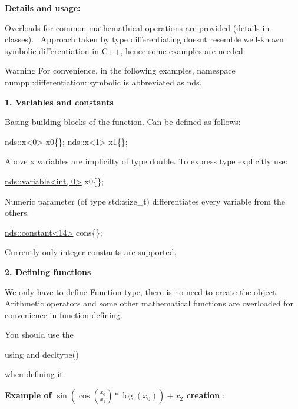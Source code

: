 {\bfseries Details and usage\+:}

Overloads for common mathemathical operations are provided (details in classes).~\newline
Approach taken by type differentiating doesn\textquotesingle{}t resemble well-\/known symbolic differentiation in C++, hence some examples are needed\+:

\begin{DoxyWarning}{Warning}
For convenience, in the following examples, namespace numpp\+::differentiation\+::symbolic is abbreviated as nds.
\end{DoxyWarning}
{\bfseries 1. Variables and constants }

Basing building blocks of the function. Can be defined as follows\+: 
\begin{DoxyCode}
\hyperlink{classnumpp_1_1differentiation_1_1symbolic_1_1variable}{nds::x<0>} x0\{\};
\hyperlink{classnumpp_1_1differentiation_1_1symbolic_1_1variable}{nds::x<1>} x1\{\};
\end{DoxyCode}


Above x variables are implicilty of type double. To express type explicitly use\+:


\begin{DoxyCode}
\hyperlink{classnumpp_1_1differentiation_1_1symbolic_1_1variable}{nds::variable<int, 0>} x0\{\};
\end{DoxyCode}


Numeric parameter (of type std\+::size\+\_\+t) differentiates every variable from the others.


\begin{DoxyCode}
\hyperlink{classnumpp_1_1differentiation_1_1symbolic_1_1constant}{nds::constant<14>} cons\{\};
\end{DoxyCode}


Currently only integer constants are supported.

{\bfseries 2. Defining functions }

We only have to define Function type, there is no need to create the object.~\newline
Arithmetic operators and some other mathematical functions are overloaded for convenience in function defining.

You should use the
\begin{DoxyCode}
\textcolor{keyword}{using} and decltype() 
\end{DoxyCode}
 when defining it.

{\bfseries Example of $ \sin(\cos(\frac{x_0}{x_1})*\log(x_0)) + x_2 $ creation} \+:



